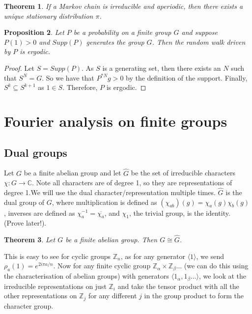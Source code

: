 \documentclass[]{article}
\newtheorem{theorem}{Theorem}
\newtheorem{proposition}[theorem]{Proposition}
\theoremstyle{definition}
\numberwithin{theorem}{section}
\numberwithin{equation}{section}
\begin{document}
\begin{theorem}
	If a Markov chain is irreducible and aperiodic, then there exists a unique stationary distribution $\pi$. 
\end{theorem}



\begin{proposition}
	Let $P$ be a probability on a finite group $G$ and suppose $P(1) > 0$ and $Supp(P)$ generates the group $G$. Then the random walk driven by $P$ is ergodic.
\end{proposition}

\begin{proof}
	Let $S = Supp(P)$. As $S$ is a generating set, then there exists an $N$ such that $S^N = G$. So we have that $P^{\ast N} g > 0$ by the definition of the support. Finally, $S^{k} \subseteq S^{k + 1}$ as $1 \in S$. Therefore, $P$ is ergodic. 
\end{proof}
\section{Fourier analysis on finite groups}
\subsection{Dual groups}
Let $G$ be a finite abelian group and let $\widehat{G}$ be the set of irreducible characters $\chi: G \rightarrow \mathbb{C}$. Note all characters are of degree 1, so they are representations of degree 1.We will use the dual character/representation multiple times. $\widehat{G}$ is the dual group of $G$, where multiplication is defined as $(\chi_{ab})(g) = \chi_a(g)\chi_b(g)$, inverses are defined as $\chi_a^{-1} = \overline{\chi_a}$, and $\chi_1$, the trivial group, is the identity. (Prove later!).

\begin{theorem}
	Let $G$ be a finite abelian group. Then $G \cong \widehat{G}$.
\end{theorem}
This is easy to see for cyclic groups $\mathbb{Z}_n$, as for any generator $\langle 1 \rangle$, we send $\rho_a(1) = e^{2 i \pi a / n}$. Now for any finite cyclic group $\mathbb{Z}_{\alpha} \times \mathbb{Z}_{\beta}... $ (we can do this using the characterisation of abelian groups) with generators $\langle 1_{\alpha}, 1_\beta... \rangle$, we look at the irreducible representations on just $\mathbb{Z}_{i}$ and take the tensor product with all the other representations on $\mathbb{Z}_j$ for any different $j$ in the group product to form the character group. 
\end{document}
